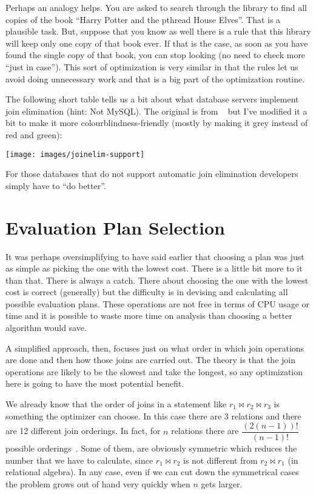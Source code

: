 \documentclass[a4paper]{report}
\begin{document}
Perhaps an analogy helps. You are asked to search through the library to find all copies of the book ``Harry Potter and the pthread House Elves''. That is a plausible task. But, suppose that you know as well there is a rule that this library will keep only one copy of that book ever. If that is the case, as soon as you have found the single copy of that book, you can stop looking (no need to check more ``just in case''). This sort of optimization is very similar in that the rules let us avoid doing unnecessary work and that is a big part of the optimization routine.

The following short table tells us a bit about what database servers implement join elimination (hint: Not MySQL). The original is from ~\cite{joinelim} but I've modified it a bit to make it more colourblindness-friendly (mostly by making it grey instead of red and green):

\begin{center}
	\texttt{[image: images/joinelim-support]}
\end{center}

For those databases that do not support automatic join elimination developers simply have to ``do better''. 

\section*{Evaluation Plan Selection}

It was perhaps oversimplifying to have said earlier that choosing a plan was just as simple as picking the one with the lowest cost. There is a little bit more to it than that. There is always a catch. There about choosing the one with the lowest cost is correct (generally) but the difficulty is in devising and calculating all possible evaluation plans. These operations are not free in terms of CPU usage or time and it is possible to waste more time on analysis than choosing a better algorithm would save. 

A simplified approach, then, focuses just on what order in which join operations are done and then how those joins are carried out. The theory is that the join operations are likely to be the slowest and take the longest, so any optimization here is going to have the most potential benefit.

We already know that the order of joins in a statement like $r_{1} \bowtie r_{2} \bowtie r_{3}$ is something the optimizer can choose. In this case there are 3 relations and there are 12 different join orderings. In fact, for $n$ relations there are $\dfrac{(2(n-1))!}{(n-1)!}$ possible orderings~\cite{dsc}. Some of them, are obviously symmetric which reduces the number that we have to calculate, since $r_{1} \bowtie r_{2}$ is not different from $r_{2} \bowtie r_{1}$ (in relational algebra). In any case, even if we can cut down the symmetrical cases the problem grows out of hand very quickly when $n$ gets larger. 
\end{document}
